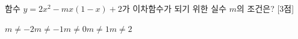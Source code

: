 함수 $y=2x^2-mx(1-x)+2$가 이차함수가 되기 위한 실수 $m$의 조건은? \mbox{[3점]}
\begin{choices32}{$m\ne -2$}{$m\ne -1$}{$m\ne 0$}{$m\ne 1$}{$m\ne 2$}\end{choices32}
